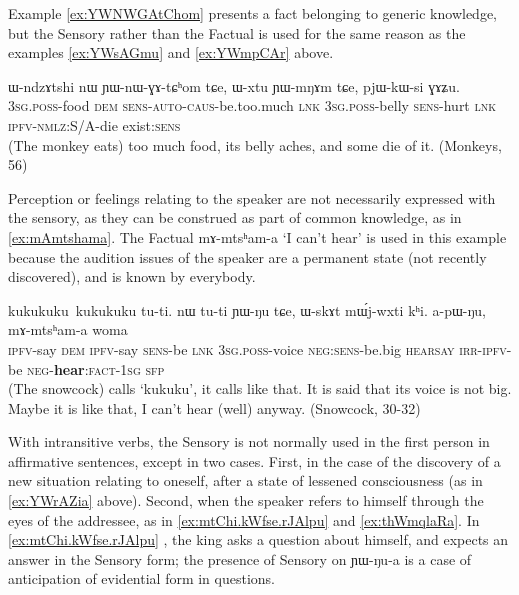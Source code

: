 \documentclass[oldfontcommands,oneside,a4paper,11pt]{article}
\newcommand{\ipa}[1]{{\phon \mbox{#1}}} %
\begin{document}
Example \ref{ex:YWNWGAtChom} presents a fact belonging to generic knowledge, but the Sensory rather than the Factual is used for the same reason as the examples \ref{ex:YWsAGmu} and \ref{ex:YWmpCAr} above.

\begin{exe}
\ex \label{ex:YWNWGAtChom}
\gll
\ipa{ɯ-ndzɤtshi}  	\ipa{nɯ}  	\ipa{ɲɯ-nɯ-ɣɤ-tɕʰom}  	\ipa{tɕe,}  	\ipa{ɯ-xtu}  	\ipa{ɲɯ-mŋɤm}  	\ipa{tɕe,}  	\ipa{pjɯ-kɯ-si}  	\ipa{ɣɤʑu.}  \\
\textsc{3sg.poss}-food \textsc{dem} \textsc{sens-auto-caus}-be.too.much \textsc{lnk} \textsc{3sg.poss}-belly \textsc{sens}-hurt \textsc{lnk} \textsc{ipfv-nmlz}:S/A-die exist:\textsc{sens} \\
\glt (The monkey eats) too much food, its belly aches, and some die of it. (Monkeys, 56)
\end{exe}
  
Perception or feelings relating to the speaker are not necessarily expressed with the sensory, as they can be construed as part of common knowledge, as in \ref{ex:mAmtshama}. The Factual  \ipa{mɤ-mtsʰam-a} `I can't hear' is used in this example because the audition issues of the speaker are a permanent state (not recently discovered), and is known by everybody.

\begin{exe}
\ex \label{ex:mAmtshama}
\gll
\ipa{kukukuku kukukuku} 	\ipa{tu-ti.} 	\ipa{nɯ} 	\ipa{tu-ti} 	\ipa{ɲɯ-ŋu} 	\ipa{tɕe,} 	\ipa{ɯ-skɤt} 	\ipa{mɯ́j-wxti} 	\ipa{kʰi.} 	\ipa{a-pɯ-ŋu,} \ipa{mɤ-mtsʰam-a} 	\ipa{woma} \\
{ } \textsc{ipfv}-say \textsc{dem}  \textsc{ipfv}-say \textsc{sens}-be \textsc{lnk}  \textsc{3sg.poss}-voice \textsc{neg:sens}-be.big \textsc{hearsay} \textsc{irr-ipfv}-be \textsc{neg}-\textbf{hear}:\textsc{fact-1sg} \textsc{sfp} \\
\glt (The snowcock) calls `kukuku', it calls like that. It is said that its voice is not big. Maybe it is like that, I can't hear (well) anyway. (Snowcock, 30-32)
\end{exe}

 With intransitive verbs, the Sensory is not normally used in the first person in affirmative sentences, except in two cases. First, in the case of the discovery of a new situation relating to oneself, after a state of lessened consciousness (as in \ref{ex:YWrAZia} above). Second, when the speaker refers to himself through the eyes of the addressee, as in \ref{ex:mtChi.kWfse.rJAlpu} and \ref{ex:thWmqlaRa}. In \ref{ex:mtChi.kWfse.rJAlpu} , the king asks a question about himself, and expects an answer in the Sensory form; the presence of Sensory on \ipa{ɲɯ-ŋu-a} is a case of anticipation of evidential form in questions.
\end{document}
